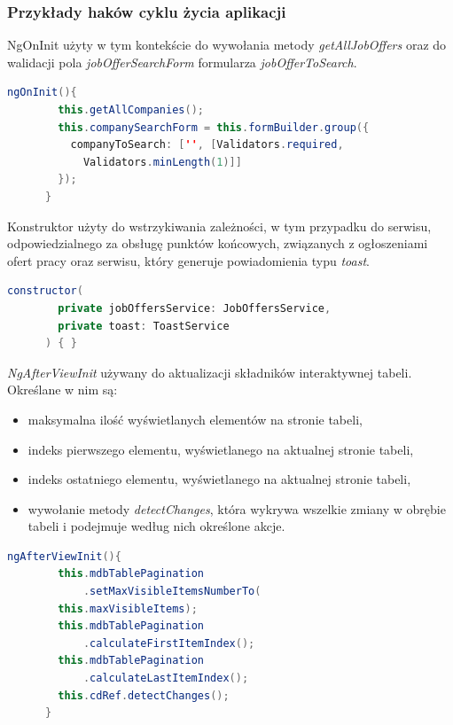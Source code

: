 \documentclass[twoside]{projektInzynierskiMS}
\numberwithin{figure}{section}
\begin{document}
\subsubsection{Przykłady haków cyklu życia aplikacji}
NgOnInit użyty w tym kontekście do wywołania metody \textit{getAllJobOffers} oraz do walidacji pola \textit{jobOfferSearchForm} formularza \textit{jobOfferToSearch}.

\begin{lstlisting}[language=Java,caption=Przykład użycia NgOnInit. Źródło: Opracowanie własne.,captionpos=b]
      ngOnInit(){
        this.getAllCompanies();
        this.companySearchForm = this.formBuilder.group({
          companyToSearch: ['', [Validators.required, 
            Validators.minLength(1)]]
        });
      }
\end{lstlisting}

Konstruktor użyty do wstrzykiwania zależności, w tym przypadku do serwisu, odpowiedzialnego za obsługę punktów końcowych, związanych z ogłoszeniami ofert pracy oraz serwisu, który generuje powiadomienia typu \textit{toast}.

\begin{lstlisting}[language=Java,caption=Użycie konstruktora do generowania powiadomień. Źródło: Opracowanie własne.,captionpos=b]
    constructor(
        private jobOffersService: JobOffersService,
        private toast: ToastService
      ) { }
\end{lstlisting}
\newpage
\textit{NgAfterViewInit} używany do aktualizacji składników interaktywnej tabeli. Określane w nim są:
\begin{itemize}
    \item maksymalna ilość wyświetlanych elementów na stronie tabeli,
    \item indeks pierwszego elementu, wyświetlanego na aktualnej stronie tabeli,
    \item indeks ostatniego elementu, wyświetlanego na aktualnej stronie tabeli,
    \item wywołanie metody \textit{detectChanges}, która wykrywa wszelkie zmiany w obrębie tabeli i podejmuje według nich określone akcje.
\end{itemize}

\begin{lstlisting}[language=Java,caption=Przykład użycia NgAfterViewInit. Źródło: Opracowanie własne.,captionpos=b]
    ngAfterViewInit(){
        this.mdbTablePagination
            .setMaxVisibleItemsNumberTo(
        this.maxVisibleItems);
        this.mdbTablePagination
            .calculateFirstItemIndex();
        this.mdbTablePagination
            .calculateLastItemIndex();
        this.cdRef.detectChanges();
      }
\end{lstlisting}
\end{document}
